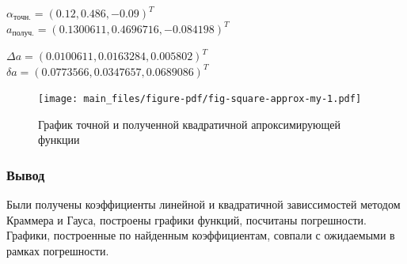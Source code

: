 \documentclass[
  letterpaper,
  DIV=11,
  numbers=noendperiod]{scrartcl}
\begin{document}
\(\alpha_{точн.} = (0.12, 0.486, -0.09)^T\)\\
\(a_{получ.} = (0.1300611, 0.4696716, -0.084198)^T\)

\(\Delta a = ( 0.0100611, 0.0163284, 0.005802)^T\)\\
\(\delta a = (0.0773566, 0.0347657, 0.0689086)^T\)

\begin{figure}

{\centering \texttt{[image: main\_files/figure-pdf/fig-square-approx-my-1.pdf]}

}

\caption{\label{fig-square-approx-my}График точной и полученной
квадратичной апроксимирующей функции}

\end{figure}

\subsubsection{Вывод}\label{ux432ux44bux432ux43eux434}

Были получены коэффициенты линейной и квадратичной зависсимостей методом
Краммера и Гауса, построены графики функций, посчитаны погрешности.
Графики, построенные по найденным коэффициентам, совпали с ожидаемыми в
рамках погрешности.
\end{document}
